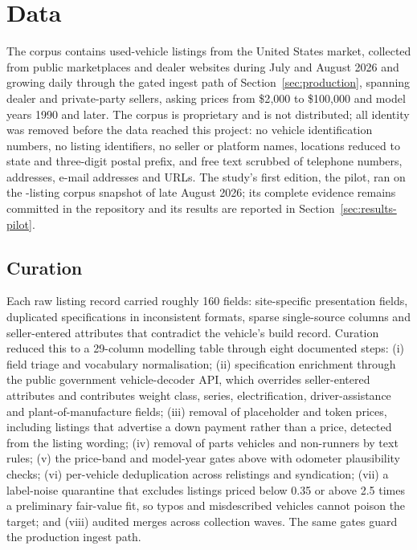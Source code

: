 \documentclass[journal,10pt]{IEEEtran}
\begin{document}
\section{Data}
\label{sec:data}
The corpus contains \NRows{} used-vehicle listings from the United States market, collected from public marketplaces and dealer websites during July and August 2026 and growing daily through the gated ingest path of Section~\ref{sec:production}, spanning dealer and private-party sellers, asking prices from \$2{,}000 to \$100{,}000 and model years 1990 and later. The corpus is proprietary and is not distributed; all identity was removed before the data reached this project: no vehicle identification numbers, no listing identifiers, no seller or platform names, locations reduced to state and three-digit postal prefix, and free text scrubbed of telephone numbers, addresses, e-mail addresses and URLs. The study's first edition, the pilot, ran on the \PilotRows{}-listing corpus snapshot of late August 2026; its complete evidence remains committed in the repository and its results are reported in Section~\ref{sec:results-pilot}.

\subsection{Curation}
Each raw listing record carried roughly 160 fields: site-specific presentation fields, duplicated specifications in inconsistent formats, sparse single-source columns and seller-entered attributes that contradict the vehicle's build record. Curation reduced this to a 29-column modelling table through eight documented steps: (i) field triage and vocabulary normalisation; (ii) specification enrichment through the public government vehicle-decoder API, which overrides seller-entered attributes and contributes weight class, series, electrification, driver-assistance and plant-of-manufacture fields; (iii) removal of placeholder and token prices, including listings that advertise a down payment rather than a price, detected from the listing wording; (iv) removal of parts vehicles and non-runners by text rules; (v) the price-band and model-year gates above with odometer plausibility checks; (vi) per-vehicle deduplication across relistings and syndication; (vii) a label-noise quarantine that excludes listings priced below 0.35 or above 2.5 times a preliminary fair-value fit, so typos and misdescribed vehicles cannot poison the target; and (viii) audited merges across collection waves. The same gates guard the production ingest path.
\end{document}
